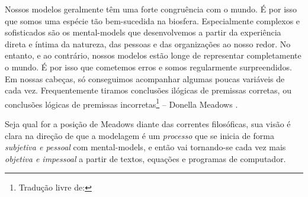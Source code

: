 \documentclass[./main.tex]{subfiles}
\begin{document}
\begin{adjustwidth}{100pt}{0pt}
\medskip
\small Nossos modelos geralmente têm uma forte congruência com o mundo. É por isso que somos uma espécie tão bem-sucedida na biosfera. Especialmente complexos e sofisticados são os \gls{mental-models} que desenvolvemos a partir da experiência direta e íntima da natureza, das pessoas e das organizações ao nosso redor. No entanto, e ao contrário, nossos modelos estão longe de representar completamente o mundo. É por isso que cometemos erros e somos regularmente surpreendidos. Em nossas cabeças, só conseguimos acompanhar algumas poucas variáveis de cada vez. Frequentemente tiramos conclusões ilógicas de premissas corretas, ou conclusões lógicas de premissas incorretas\footnote{Tradução livre de: } -- Donella Meadows \cite{meadows2008}.
\medskip
\end{adjustwidth}

\noindent Seja qual for a posição de Meadows diante das correntes filosóficas, sua visão é clara na direção de que a modelagem é um \textit{processo} que se inicia de forma \textit{subjetiva e pessoal} com \gls{mental-models}, e então vai tornando-se cada vez mais \textit{objetiva e impessoal} a partir de textos, equações e programas de computador. 
\end{document}
